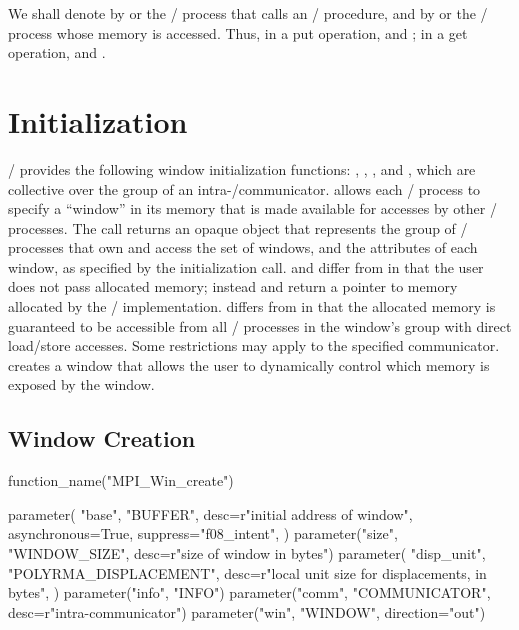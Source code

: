 We shall denote by  or  the \MPI/ process that calls an \RMA/ procedure,
and by  or  the \MPI/ process whose memory is accessed.
Thus, in a put
operation,  and ; in a
get operation,  and .

\section{Initialization}
\label{sec:one-side-2:intro}


\MPI/ provides
the following window initialization
functions: ,
,
,
and\flushline %
, which are collective over the group of an
intra\hyphen/communicator.
allows each \mpi/ process to specify a ``window'' in its
memory that is made available for accesses by other \mpi/
processes.
The call returns an opaque object
that represents the group of \mpi/
processes that own and access the set of windows,
and the attributes of each window, as specified by the initialization call.
 and  differ from
 in that the user does not pass allocated
memory; instead  and  return a
pointer to memory allocated by the \MPI/ implementation.
 differs from
 in that the allocated memory is guaranteed to be
accessible from all \mpi/ processes in the window's group with direct load/store accesses. Some
restrictions may apply to the specified communicator.
 creates a window that allows the
user to dynamically control which memory is exposed by the window.

\subsection{Window Creation}
\label{chap:one-side-2:win_create}

%
%
\begin{mpi-binding}
    function_name("MPI_Win_create")
    
    parameter(
        "base",
        "BUFFER",
        desc=r"initial address of window",
        asynchronous=True,
        suppress="f08_intent",
    )
    parameter("size", "WINDOW_SIZE", desc=r"size of window in bytes")
    parameter(
        "disp_unit",
        "POLYRMA_DISPLACEMENT",
        desc=r"local unit size for displacements, in bytes",
    )
    parameter("info", "INFO")
    parameter("comm", "COMMUNICATOR", desc=r"intra-communicator")
    parameter("win", "WINDOW", direction="out")
\end{mpi-binding}

